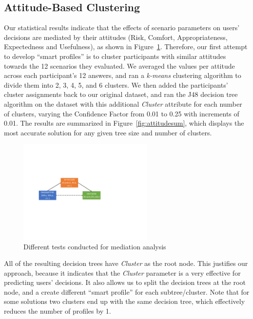 \subsection{Attitude-Based Clustering}
Our statistical results indicate that the effects of scenario parameters on users' decisions are mediated by their attitudes (Risk, Comfort, Appropriateness, Expectedness and Usefulness), as shown in Figure~\ref{fig:mediation_test2}. Therefore, our first attempt to develop ``smart profiles'' is to cluster participants with similar attitudes towards the 12 scenarios they evaluated. We averaged the values per attitude across each participant's 12 answers, and ran a \textit{k-means} clustering algorithm to divide them into 2, 3, 4, 5, and 6 clusters. We then added the participants' cluster assignments back to our original dataset, and ran the J48 decision tree algorithm on the dataset with this additional \emph{Cluster} attribute for each number of clusters, varying the Confidence Factor from 0.01 to 0.25 with increments of 0.01. The results are summarized in Figure~\ref{fig:attitudesum}, which displays the most accurate solution for any given tree size and number of clusters.

\begin{figure}[htb]
	\centering
	\includegraphics[width=0.6\textwidth]{figures/mediation_test.pdf}
	\caption{Different tests conducted for mediation analysis}
	\label{fig:mediation_test2}
\end{figure}


All of the resulting decision trees have \emph{Cluster} as the root node. This justifies our approach, because it indicates that the \emph{Cluster} parameter is a very effective for predicting users' decisions. It also allows us to split the decision trees at the root node, and a create different ``smart profile'' for each subtree/cluster. Note that for some solutions two clusters end up with the same decision tree, which effectively reduces the number of profiles by 1.

